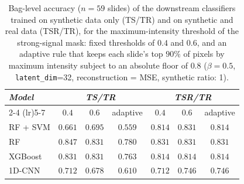 \begin{table}[H]
\centering
\small
\caption{Bag-level accuracy ($n=59$ slides) of the downstream classifiers trained on synthetic data only (TS/TR) and on synthetic and real data (TSR/TR), for the maximum-intensity threshold of the strong-signal mask: fixed thresholds of $0.4$ and $0.6$, and an adaptive rule that keeps each slide's top $90\%$ of pixels by maximum intensity subject to an absolute floor of $0.8$ ($\beta=0.5$, \texttt{latent\_dim}=32, reconstruction = MSE, synthetic ratio: 1).}
\label{tab:threshold_results}
\begin{tabular*}{\textwidth}{@{\extracolsep{\fill}}lcccccc}
\toprule
\multirow{2}{*}{\emph{Model}} & \multicolumn{3}{c}{\emph{TS/TR}} & \multicolumn{3}{c}{\emph{TSR/TR}} \\
\cmidrule(lr){2-4} \cmidrule(lr){5-7}
 & $0.4$ & $0.6$ & adaptive & $0.4$ & $0.6$ & adaptive \\
\midrule
RF + SVM & $0.661$ & $0.695$ & $0.559$ & $0.814$ & $0.831$ & $0.814$ \\
RF & $0.847$ & $0.831$ & $0.780$ & $0.831$ & $0.831$ & $0.831$ \\
XGBoost & $0.831$ & $0.831$ & $0.763$ & $0.814$ & $0.814$ & $0.814$ \\
1D-CNN & $0.712$ & $0.678$ & $0.610$ & $0.712$ & $0.746$ & $0.746$ \\
\bottomrule
\end{tabular*}
\end{table}
